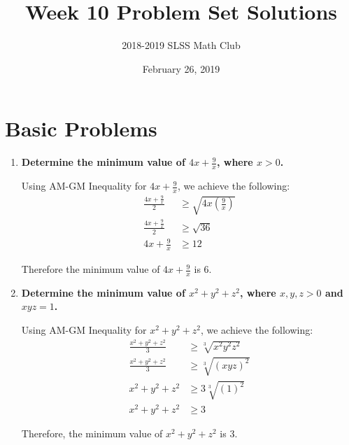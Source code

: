 \documentclass[12pt]{article}
\title{Week 10 Problem Set Solutions\vspace{-3mm}}
\author{2018-2019 SLSS Math Club\vspace{-5mm}}
\date{February 26, 2019\vspace{-5mm}}
\begin{document}
\maketitle

\section*{Basic Problems}
\begin{enumerate}
    \item \textbf{Determine the minimum value of $4x + \frac{9}{x}$, where $x > 0$.}
    
    Using AM-GM Inequality for $4x + \frac{9}{x}$, we achieve the following:
    \begin{align*}
        \frac{4x + \frac{9}{x}}{2} &\geq \sqrt{4x(\tfrac{9}{x})} \\
        \frac{4x + \frac{9}{x}}{2} &\geq \sqrt{36} \\
        4x + \frac{9}{x} &\geq 12
    \end{align*}
    
    Therefore the minimum value of $4x + \frac{9}{x}$ is $6$.
    
    \item \textbf{Determine the minimum value of $x^2 + y^2 + z^2$, where $x, y, z > 0$ and $xyz = 1$.} 
    
    Using AM-GM Inequality for $x^2 + y^2 + z^2$, we achieve the following:
    \begin{align*}
        \frac{x^2 + y^2 + z^2}{3} &\geq \sqrt[3]{x^2y^2z^2} \\
        \frac{x^2 + y^2 + z^2}{3} &\geq \sqrt[3]{(xyz)^2} \\
        x^2 + y^2 + z^2 &\geq 3 \sqrt[3]{(1)^2} \\
        x^2 + y^2 + z^2 &\geq 3
    \end{align*}
    
    Therefore, the minimum value of $x^2 + y^2 + z^2$ is $3$.
\end{enumerate}
\end{document}
